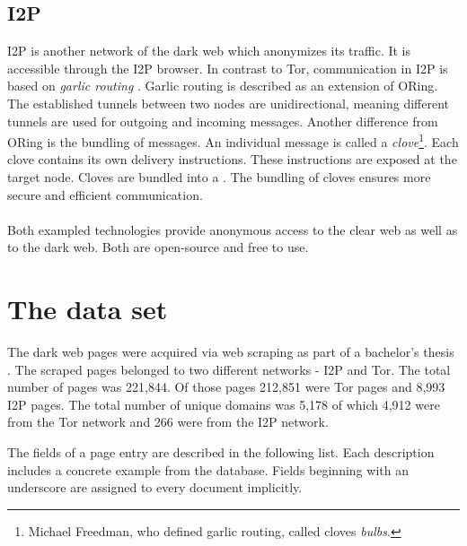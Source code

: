 \subsection{I2P} \label{I2P}
I2P \cite{i2pIntro} is another network of the dark web which anonymizes its traffic. It is accessible through the I2P browser. In contrast to Tor, communication in I2P is based on \textit{garlic routing} \cite{garlicRouting}. Garlic routing is described as an extension of ORing. The established tunnels between two nodes are unidirectional, meaning different tunnels are used for outgoing and incoming messages. Another difference from ORing is the bundling of messages. An individual message is called a \textit{clove}\footnote{Michael Freedman, who defined garlic routing, called cloves \textit{bulbs}.}. Each clove contains its own delivery instructions. These instructions are exposed at the target node. Cloves are bundled into a . The bundling of cloves ensures more secure and efficient communication. 
\\
\\
Both exampled technologies provide anonymous access to the clear web as well as to the dark web. Both are open-source and free to use.

\section{The data set} \label{dataSet}
The dark web pages were acquired via web scraping as part of a bachelor's thesis \cite{bcScraping}. The scraped pages belonged to two different networks - I2P  and Tor. The total number of pages was 221,844. Of those pages 212,851 were Tor pages and 8,993 I2P pages. The total number of unique domains was 5,178 of which 4,912 were from the Tor network and 266 were from the I2P network. 

The fields of a page entry are described in the following list. Each description includes a concrete example from the database. Fields beginning with an underscore are assigned to every document implicitly.


